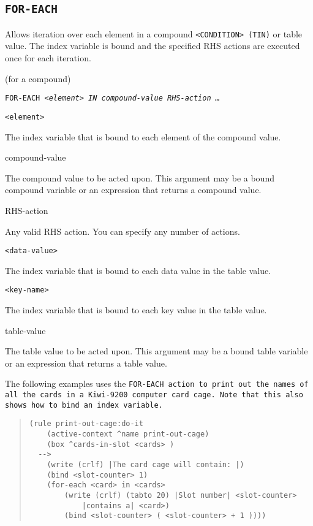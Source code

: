 \subsection{\tt{FOR-EACH}}

Allows iteration over each element in a compound
\verb|<CONDITION> (TIN)| or table value. The index variable is bound
and the specified RHS actions are executed once for each iteration.

\Format (for a compound)

\tt{FOR-EACH} \verb|<|\it{element}\verb|>| \tt{IN} \it{compound-value}
\it{RHS-action} \ldots

\begin{arguments}
\item[\tt{<}element\tt{>}]

  The index variable that is bound to each element of the compound
  value.

\item[compound-value]

  The compound value to be acted upon. This argument may be a bound
  compound variable or an expression that returns a compound value.

\item[RHS-action]

  Any valid RHS action. You can specify any number of actions.

\item[\tt{<}data-value\tt{>}]

  The index variable that is bound to each data value in the table
  value.

\item[\tt{<}key-name\tt{>}]

  The index variable that is bound to each key value in the table
  value.

\item[table-value]

  The table value to be acted upon. This argument may be a bound table
  variable or an expression that returns a table value.
\end{arguments}

\Example

The following examples uses the \tt{FOR-EACH} action to print out the
names of all the cards in a Kiwi-9200 computer card cage.  Note that
this also shows how to bind an index variable.

\begin{quote}
\begin{verbatim}
(rule print-out-cage:do-it
    (active-context ^name print-out-cage)
    (box ^cards-in-slot <cards> )
  -->
    (write (crlf) |The card cage will contain: |)
    (bind <slot-counter> 1)
    (for-each <card> in <cards>
        (write (crlf) (tabto 20) |Slot number| <slot-counter>
            |contains a| <card>)
        (bind <slot-counter> ( <slot-counter> + 1 ))))
\end{verbatim}
\end{quote}

